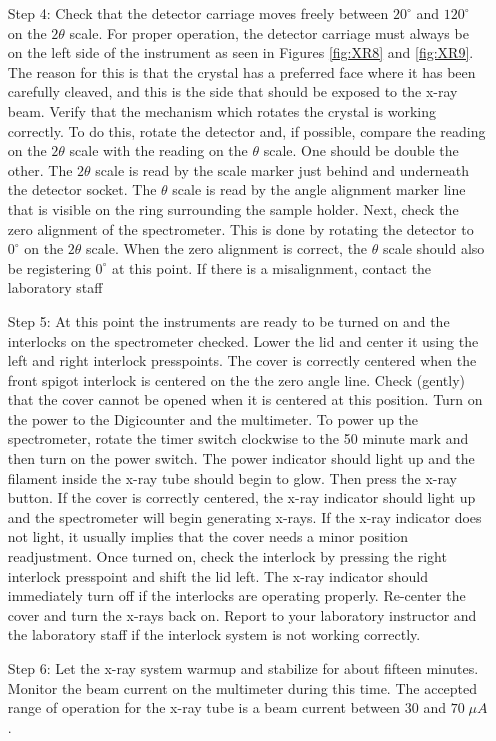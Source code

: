 \documentclass[12pt, a4paper, oneside, openright, titlepage]{book}
\begin{document}
\begin{itemize}[leftmargin = 50pt]
    \item[Step 4:] Check that the detector carriage moves freely between $20^{\circ}$ and $120^{\circ}$ on the $2\theta$ scale. For proper operation, the detector carriage must always be on the left side of the instrument as seen in Figures \ref{fig:XR8} and \ref{fig:XR9}. The reason for this is that the crystal has a preferred face where it has been carefully cleaved, and this is the side that should be exposed to the x-ray beam. Verify that the mechanism which rotates the crystal is working correctly. To do this, rotate the detector and, if possible, compare the reading on the $2\theta$ scale with the reading on the $\theta$ scale. One should be double the other. The $2\theta$ scale is read by the scale marker just behind and underneath the detector socket. The $\theta$ scale is read by the angle alignment marker line that is visible on the ring surrounding the sample holder. Next, check the zero alignment of the spectrometer. This is done by rotating the detector to $0^{\circ}$ on the $2\theta$ scale. When the zero alignment is correct, the $\theta$ scale should also be registering $0^{\circ}$ at this point. If there is a misalignment, contact the laboratory staff
    \item[Step 5:] At this point the instruments are ready to be turned on and the interlocks on the spectrometer checked. Lower the lid and center it using the left and right interlock presspoints. The cover is correctly centered when the front spigot interlock is centered on the the zero angle line. Check (gently) that the cover cannot be opened when it is centered at this position. Turn on the power to the Digicounter and the multimeter. To power up the spectrometer, rotate the timer switch clockwise to the 50 minute mark and then turn on the power switch. The power indicator should light up and the filament inside the x-ray tube should begin to glow. Then press the x-ray button. If the cover is correctly centered, the x-ray indicator should light up and the spectrometer will begin generating x-rays. If the x-ray indicator does not light, it usually implies that the cover needs a minor position readjustment. Once turned on, check the interlock by pressing the right interlock presspoint and shift the lid left. The x-ray indicator should immediately turn off if the interlocks are operating properly. Re-center the cover and turn the x-rays back on. Report to your laboratory instructor and the laboratory staff if the interlock system is not working correctly.
    \item[Step 6:] Let the x-ray system warmup and stabilize for about fifteen minutes. Monitor the beam current on the multimeter during this time. The accepted range of operation for the x-ray tube is a beam current between $30$ and $70 \;\mu A$.

\end{itemize}
\end{document}
